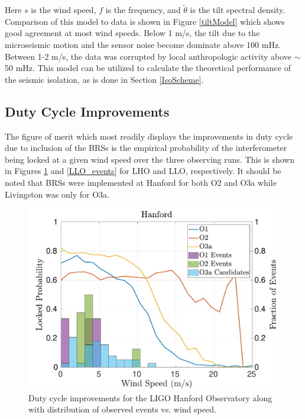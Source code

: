\documentclass [12pt, proquest]{uwthesis}[2019]
\begin{document}
Here $s$ is the wind speed, $f$ is the frequency, and $\tilde{\theta}$ is the tilt spectral density. Comparison of this model to data is shown in Figure \ref{tiltModel} which shows good agreement at most wind speeds. Below 1 m/s, the tilt due to the microseismic motion and the sensor noise become dominate above 100 mHz. Between 1-2 m/s, the data was corrupted by local anthropologic activity above $\sim$50 mHz. This model can be utilized to calculate the theoretical performance of the seismic isolation, as is done in Section \ref{IsoScheme}.

\subsection{Duty Cycle Improvements}

The figure of merit which most readily displays the improvements in duty cycle due to inclusion of the BRSs is the empirical probability of the interferometer being locked at a given wind speed over the three observing runs. This is shown in Figures \ref{LHO_events} and \ref{LLO_events} for LHO and LLO, respectively. It should be noted that BRSs were implemented at Hanford for both O2 and O3a while Livingston was only for O3a.

\begin{figure}[!h]
\begin{center}
\includegraphics[width=\textwidth]{LHO_WindVsLockEvents.pdf}
\caption[Duty cycle improvements for the LIGO Hanford Observatory]{Duty cycle improvements for the LIGO Hanford Observatory along with distribution of observed events vs. wind speed. }
\label{LHO_events}
\end{center}
\end{figure}
\end{document}
